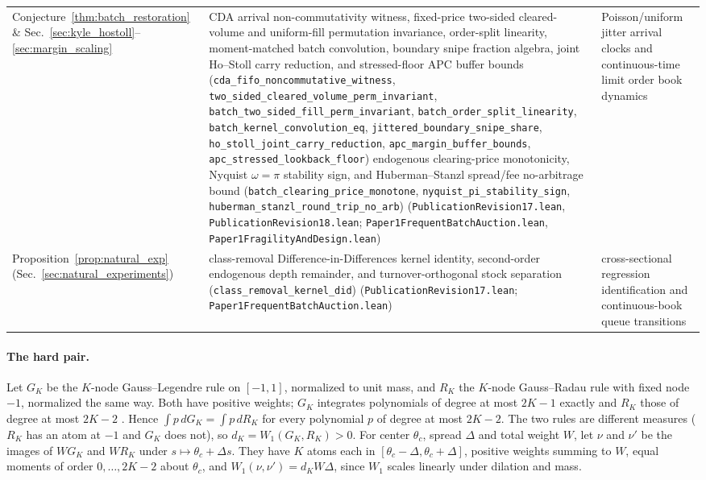 \documentclass[12pt]{article}
\theoremstyle{definition}
\theoremstyle{remark}
\begin{document}
{\begin{longtable}{>{\raggedright\arraybackslash}p{}>{\raggedright\arraybackslash}p{}>{\raggedright\arraybackslash}p{}}
Conjecture~\ref{thm:batch_restoration} \& Sec.~\ref{sec:kyle_hostoll}--\ref{sec:margin_scaling} & CDA arrival non-commutativity witness, fixed-price two-sided cleared-volume and uniform-fill permutation invariance, order-split linearity, moment-matched batch convolution, boundary snipe fraction algebra, joint Ho--Stoll carry reduction, and stressed-floor APC buffer bounds (\texttt{cda\_fifo\_noncommutative\_witness}, \texttt{two\_sided\_cleared\_volume\_perm\_invariant}, \texttt{batch\_two\_sided\_fill\_perm\_invariant}, \texttt{batch\_order\_split\_linearity}, \texttt{batch\_kernel\_convolution\_eq}, \texttt{jittered\_boundary\_snipe\_share}, \texttt{ho\_stoll\_joint\_carry\_reduction}, \texttt{apc\_margin\_buffer\_bounds}, \texttt{apc\_stressed\_lookback\_floor}) endogenous clearing-price monotonicity, Nyquist $\omega=\pi$ stability sign, and Huberman--Stanzl spread/fee no-arbitrage bound (\texttt{batch\_clearing\_price\_monotone}, \texttt{nyquist\_pi\_stability\_sign}, \texttt{huberman\_stanzl\_round\_trip\_no\_arb}) (\nolinkurl{PublicationRevision17.lean}, \nolinkurl{PublicationRevision18.lean}; \nolinkurl{Paper1FrequentBatchAuction.lean}, \nolinkurl{Paper1FragilityAndDesign.lean}) & Poisson/uniform jitter arrival clocks and continuous-time limit order book dynamics\\
Proposition~\ref{prop:natural_exp} (Sec.~\ref{sec:natural_experiments}) & class-removal Difference-in-Differences kernel identity, second-order endogenous depth remainder, and turnover-orthogonal stock separation (\texttt{class\_removal\_kernel\_did}) (\nolinkurl{PublicationRevision17.lean}; \nolinkurl{Paper1FrequentBatchAuction.lean}) & cross-sectional regression identification and continuous-book queue transitions\\
\bottomrule
\end{longtable}}

\paragraph{The hard pair.} Let $G_K$ be the $K$-node Gauss--Legendre rule on $[-1,1]$, normalized to unit mass, and $R_K$ the $K$-node Gauss--Radau rule with fixed node $-1$, normalized the same way. Both have positive weights; $G_K$ integrates polynomials of degree at most $2K-1$ exactly and $R_K$ those of degree at most $2K-2$ \citep[Section~3.4]{szego1975}. Hence $\int p\,dG_K=\int p\,dR_K$ for every polynomial $p$ of degree at most $2K-2$. The two rules are different measures ($R_K$ has an atom at $-1$ and $G_K$ does not), so $d_K=W_1(G_K,R_K)>0$. For center $\theta_c$, spread $\Delta$ and total weight $W$, let $\nu$ and $\nu'$ be the images of $WG_K$ and $WR_K$ under $s\mapsto\theta_c+\Delta s$. They have $K$ atoms each in $[\theta_c-\Delta,\theta_c+\Delta]$, positive weights summing to $W$, equal moments of order $0,\ldots,2K-2$ about $\theta_c$, and $W_1(\nu,\nu')=d_KW\Delta$, since $W_1$ scales linearly under dilation and mass.
\end{document}
